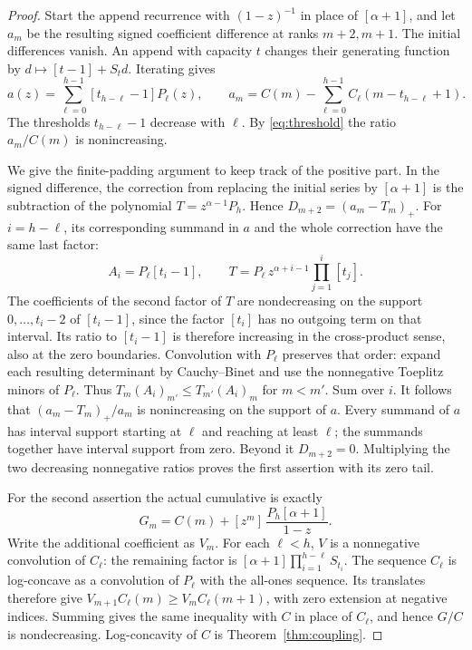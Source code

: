 \documentclass[11pt]{article}
\begin{document}
\begin{proof}
Start the append recurrence with \((1-z)^{-1}\) in place of
\([\alpha+1]\), and let \(a_m\) be the resulting signed coefficient
difference at ranks \(m+2,m+1\). The initial differences vanish.
An append with capacity \(t\) changes their generating function by
\(d\mapsto[t-1]+S_t d\). Iterating gives
\[
 a(z)=\sum_{\ell=0}^{h-1}[t_{h-\ell}-1]P_\ell(z),\qquad
 a_m=C(m)-\sum_{\ell=0}^{h-1}C_\ell(m-t_{h-\ell}+1).
\]
The thresholds \(t_{h-\ell}-1\) decrease with \(\ell\). By
\eqref{eq:threshold} the ratio \(a_m/C(m)\) is nonincreasing.

We give the finite-padding argument to keep track of the positive part.
In the signed difference, the correction from replacing the initial
series by \([\alpha+1]\) is the subtraction of the polynomial
\(T=z^{\alpha-1}P_h\). Hence \(D_{m+2}=(a_m-T_m)_+\).
For \(i=h-\ell\), its corresponding summand in \(a\) and the whole
correction have the same last factor:
\[
  A_i=P_\ell[t_i-1],\qquad
  T=P_\ell\, z^{\alpha+i-1}\prod_{j=1}^i[t_j].
\]
The coefficients of the second factor of \(T\) are nondecreasing
on the support \(0,\ldots,t_i-2\) of \([t_i-1]\), since the factor
\([t_i]\) has no outgoing term on that interval. Its ratio to
\([t_i-1]\) is therefore increasing in the cross-product sense, also
at the zero boundaries. Convolution with \(P_\ell\) preserves that
order: expand each resulting determinant by Cauchy--Binet and use
the nonnegative Toeplitz minors of \(P_\ell\). Thus
\(T_m(A_i)_{m'}\le T_{m'}(A_i)_m\) for \(m<m'\). Sum over \(i\).
It follows that \((a_m-T_m)_+/a_m\) is nonincreasing on the
support of \(a\). Every summand of \(a\) has interval support
starting at \(\ell\) and reaching at least \(\ell\); the summands
together have interval support from zero. Beyond it \(D_{m+2}=0\).
Multiplying the two decreasing nonnegative ratios proves the first
assertion with its zero tail.

For the second assertion the actual cumulative is exactly
\[
        G_m=C(m)+[z^m]\,\frac{P_h[\alpha+1]}{1-z}.
\]
Write the additional coefficient as \(V_m\). For each
\(\ell<h\), \(V\) is a nonnegative convolution of \(C_\ell\):
the remaining factor is \([\alpha+1]\prod_{i=1}^{h-\ell}S_{t_i}\).
The sequence \(C_\ell\) is log-concave as a convolution of
\(P_\ell\) with the all-ones sequence. Its translates therefore
give \(V_{m+1}C_\ell(m)\ge V_m C_\ell(m+1)\), with zero extension
at negative indices. Summing gives the same inequality with \(C\)
in place of \(C_\ell\), and hence \(G/C\) is nondecreasing.
Log-concavity of \(C\) is Theorem~\ref{thm:coupling}.
\end{proof}
\end{document}
